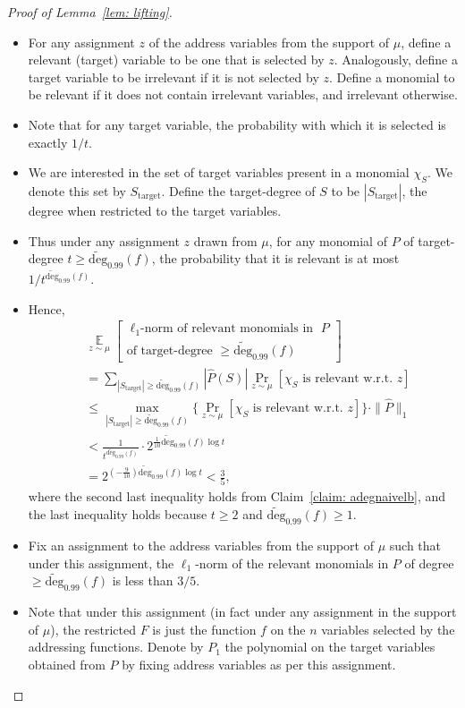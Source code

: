 \documentclass[10pt,a4paper]{article}
\theoremstyle{definition}
\newcommand{\adeg}{\widetilde{\mathrm{deg}}}
\newcommand{\snorm}[1]{\|\widehat{#1}\|_1}
\DeclareMathOperator*{\Exp}{\mathbb E}
\begin{document}
\begin{proof}[Proof of Lemma~\ref{lem: lifting}]
\begin{itemize}
    \item For any assignment $z$ of the address variables from the support of $\mu$, define a relevant (target) variable to be one that is selected by $z$. Analogously, define a target variable to be irrelevant if it is not selected by $z$. Define a monomial to be relevant if it does not contain irrelevant variables, and irrelevant otherwise.
    \item Note that for any target variable, the probability with which it is selected is exactly $1/t$.
    \item We are interested in the set of target variables present in a monomial $\chi_S$. We denote this set by $S_{\mathrm{target}}$. Define the target-degree of $S$ to be $|S_{\mathrm{target}}|$, the degree when restricted to the target variables.
    \item Thus under any assignment $z$ drawn from $\mu$, for any monomial of $P$ of target-degree $t \geq \adeg_{0.99}(f)$, the probability that it is relevant is at most $1/t^{\adeg_{0.99}(f)}$.
    \item Hence, 
    \begin{align*}
    & \Exp\limits_{z\sim\mu}[\begin{gathered}\text{$\ell_1$-norm of relevant monomials in }P\\\text{of target-degree }\geq\adeg_{0.99}(f)\end{gathered}]\\
    &= \sum\limits_{|S_{\mathrm{target}}| \geq \adeg_{0.99}(f)} |\widehat P(S)| \Pr\limits_{z\sim\mu}[\chi_S \text{ is relevant w.r.t. }z] \\
    &\leq \max_{|S_{\mathrm{target}}|\geq\adeg_{0.99}(f)}\{\Pr\limits_{z\sim\mu}[\chi_S \text{ is relevant w.r.t. }z]\} \cdot \snorm{P} \\
    &< \frac{1}{t^{\adeg_{0.99}(f)}} \cdot 2^{\frac{1}{10}\adeg_{0.99}(f) \log t} \\
    & = 2^{(-\frac{9}{10})\adeg_{0.99}(f)\log t}< \frac{3}{5},
    \end{align*}
    where the second last inequality holds from Claim~\ref{claim: adegnaivelb}, and the last inequality holds because $t\geq 2$ and $\adeg_{0.99}(f) \geq 1$.
    \item Fix an assignment to the address variables from the support of $\mu$ such that under this assignment, the $\ell_1$-norm of the relevant monomials in $P$ of degree $\geq \adeg_{0.99}(f)$ is less than $3/5$.
    \item Note that under this assignment (in fact under any assignment in the support of $\mu$), the restricted $F$ is just the function $f$ on the $n$ variables selected by the addressing functions. Denote by $P_1$ the polynomial on the target variables obtained from $P$ by fixing address variables as per this assignment.

\end{itemize}
\end{proof}
\end{document}

